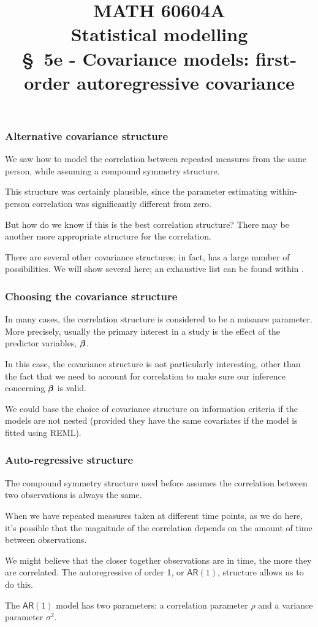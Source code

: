 \documentclass{beamer}
\title[\color{white}{MATH 60604A \S~5e - $\mathsf{AR}(1)$ covariance model}]{\texorpdfstring{MATH 60604A \\Statistical modelling \\ \S~5e - Covariance models: first-order autoregressive covariance}{MATH 60604A \\Statistical modelling \\ \S~5e - Covariance models: $\mathsf{AR}(1)$}}
\author{}
\institute{HEC Montréal\\
Department of Decision Sciences}
\date{}
\begin{document}
\frame{\titlepage}

\begin{frame}
\frametitle{Alternative covariance structure}
\bi
\item We saw how to model the correlation between repeated measures from the same person, while assuming a compound symmetry structure. 
\item This structure was certainly plausible, since the parameter estimating within-person correlation was significantly different from zero. 
\item But how do we know if this is the best correlation structure? There may be another more appropriate structure for the correlation.
\item There are several other covariance structures; in fact, \SASlang{} has a large number of possibilities. We will show several here; an exhaustive list can be found within \SASlang{}.
\ei
\end{frame}

\begin{frame}
\frametitle{Choosing the covariance structure}
\bi
\item In many cases, the correlation structure is considered to be a nuisance parameter. More precisely, usually the primary interest in a study is the effect of the predictor variables, $\boldsymbol {\beta}$. 
\item In this case, the covariance structure is not particularly interesting, other than the fact that  we need to account for correlation to make sure our inference concerning $\boldsymbol {\beta}$ is valid. 
\item We could base the choice of covariance structure on information criteria if the models are not nested (provided they have the same covariates if the model is fitted using REML).
\ei
\end{frame}

\begin{frame}
\frametitle{Auto-regressive structure}
\bi
\item The compound symmetry structure used before assumes the correlation between two observations is always the same. 
\item When we have repeated measures taken at different time points, as we do here, 
it's possible that the magnitude of the correlation depends on the amount of time between observations. 
\item We might believe that the closer together observations
are in time, the more they are correlated. The \alert{autoregressive of order 1}, or \alert{$\mathsf{AR}(1)$}, structure allows us to do this.
\item The $\mathsf{AR}(1)$ model has two parameters: a correlation parameter $\rho$ and a variance parameter $\sigma^2$.
\ei
\end{frame}
\end{document}
